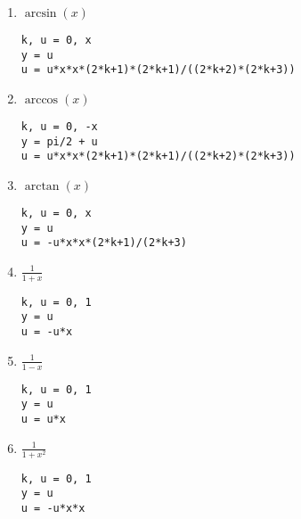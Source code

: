 \documentclass[11pt,a4paper]{article}
\begin{document}
\begin{enumerate}
\item $\displaystyle\arcsin(x)$
\hfill
\begin{minipage}[t]{9cm}\footnotesize
\begin{Verbatim}
k, u = 0, x
y = u
u = u*x*x*(2*k+1)*(2*k+1)/((2*k+2)*(2*k+3))
\end{Verbatim}
\end{minipage}
\vspace*{3mm}

\item $\displaystyle\arccos(x)$
\hfill
\begin{minipage}[t]{9cm}\footnotesize
\begin{Verbatim}
k, u = 0, -x
y = pi/2 + u
u = u*x*x*(2*k+1)*(2*k+1)/((2*k+2)*(2*k+3))
\end{Verbatim}
\end{minipage}
\vspace*{3mm}

\item $\displaystyle\arctan(x)$
\hfill
\begin{minipage}[t]{9cm}\footnotesize
\begin{Verbatim}
k, u = 0, x
y = u
u = -u*x*x*(2*k+1)/(2*k+3)
\end{Verbatim}
\end{minipage}
\vspace*{3mm}

\item $\displaystyle \frac{1}{1+x}$  
\hfill
\begin{minipage}[t]{9cm}\footnotesize
\begin{Verbatim}
k, u = 0, 1
y = u
u = -u*x
\end{Verbatim}
\end{minipage}
\vspace*{3mm}

\item $\displaystyle \frac{1}{1-x}$
\hfill
\begin{minipage}[t]{9cm}\footnotesize
\begin{Verbatim}
k, u = 0, 1
y = u
u = u*x
\end{Verbatim}
\end{minipage}
\vspace*{3mm}

\item $\displaystyle \frac{1}{1+x^2}$  
\hfill
\begin{minipage}[t]{9cm}\footnotesize
\begin{Verbatim}
k, u = 0, 1
y = u
u = -u*x*x
\end{Verbatim}
\end{minipage}
\vspace*{3mm}


\end{enumerate}
\end{document}
